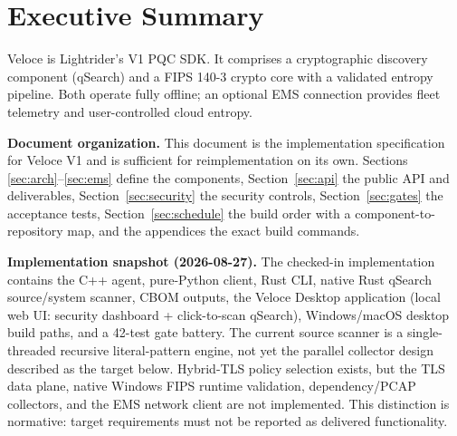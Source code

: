 \documentclass[10pt]{article}
\begin{document}
\tableofcontents
\newpage

\section{Executive Summary}\label{sec:exec}

Veloce is Lightrider's V1 PQC SDK. It comprises a cryptographic discovery component
(qSearch) and a FIPS 140-3 crypto core with a validated entropy pipeline. Both operate
fully offline; an optional EMS connection provides fleet telemetry and user-controlled
cloud entropy.

\textbf{Document organization.} This document is the implementation specification for
Veloce V1 and is sufficient for reimplementation on its own. Sections
\ref{sec:arch}--\ref{sec:ems} define the components, Section~\ref{sec:api} the public
API and deliverables, Section~\ref{sec:security} the security controls,
Section~\ref{sec:gates} the acceptance tests, Section~\ref{sec:schedule} the build order
with a component-to-repository map, and the appendices the exact build commands.

\textbf{Implementation snapshot (2026-08-27).} The checked-in implementation contains
the C++ agent, pure-Python client, Rust CLI, native Rust qSearch source/system scanner,
CBOM outputs, the Veloce Desktop application (local web UI: security dashboard +
click-to-scan qSearch), Windows/macOS desktop build paths, and a 42-test gate battery.
The current source scanner is a single-threaded recursive literal-pattern engine, not yet
the parallel collector design described as the target below. Hybrid-TLS policy selection
exists, but the TLS data plane, native Windows FIPS runtime validation, dependency/PCAP
collectors, and the EMS network client are not implemented. This distinction is
normative: target requirements must not be reported as delivered functionality.
\end{document}
